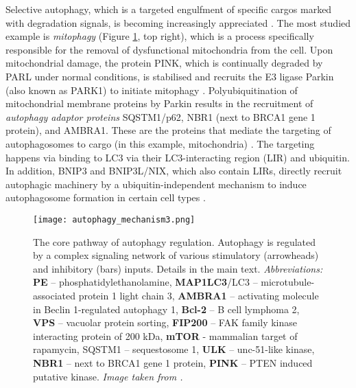         Selective autophagy, which is a targeted engulfment of specific cargos marked with degradation signals, is becoming increasingly appreciated \cite{Kaur2015}. The most studied example is \textit{mitophagy} (Figure \ref{fig:corepath}, top right), which is a process specifically responsible for the removal of dysfunctional mitochondria from the cell.
    Upon mitochondrial damage, the protein PINK, which is continually degraded by PARL under normal conditions, is stabilised and recruits the E3 ligase Parkin (also known as PARK1) to initiate mitophagy \cite{Kroemer2010}. Polyubiquitination of mitochondrial membrane proteins by Parkin results in the recruitment of \textit{autophagy adaptor proteins} SQSTM1/p62, NBR1 (next to BRCA1 gene 1 protein), and AMBRA1. These are the proteins that mediate the targeting of autophagosomes to cargo (in this example, mitochondria) \cite{Kaur2015}. The targeting happens via binding to LC3 via their LC3-interacting region (LIR) and ubiquitin. In addition, BNIP3 and BNIP3L/NIX, which also contain LIRs, directly recruit autophagic machinery by a ubiquitin-independent mechanism to induce autophagosome formation in certain cell types \cite{Kroemer2010}.\\
    
    
     
        
             \begin{figure}[!h]
            \centering
            \texttt{[image: autophagy\_mechanism3.png]}
            \caption[Autophagy core pathway mechanism]{The core pathway of autophagy regulation. Autophagy is regulated by a complex signaling network of various stimulatory (arrowheads) and inhibitory (bars) inputs. Details in the main text. \textit{Abbreviations:} \textbf{PE} -- phosphatidylethanolamine, \textbf{MAP1LC3}/LC3 -- microtubule-associated protein 1 light chain 3, \textbf{AMBRA1} -- activating molecule in Beclin 1-regulated autophagy 1, \textbf{Bcl-2} -- B cell lymphoma 2, \textbf{VPS} -- vacuolar protein sorting, \textbf{FIP200} -- FAK family kinase interacting protein of 200 kDa, \textbf{mTOR} - mammalian target of rapamycin, SQSTM1 -- sequestosome 1, \textbf{ULK} -- unc-51-like kinase, \textbf{NBR1} -- next to BRCA1 gene 1 protein, \textbf{PINK} -- PTEN induced putative kinase. \textit{Image taken from \cite{AutophagyTechnology}.}
            }
            \label{fig:corepath}
            \end{figure} 

